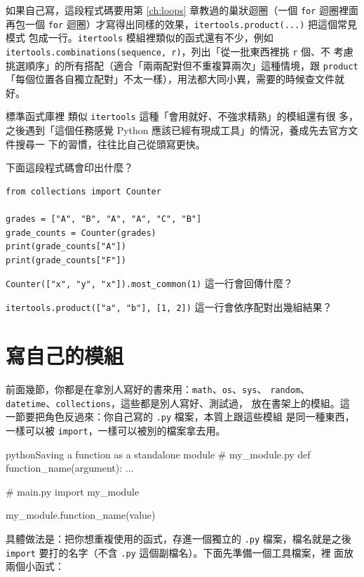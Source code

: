 如果自己寫，這段程式碼要用第 \ref{ch:loops} 章教過的巢狀迴圈（一個 \texttt{for} 迴圈裡面再包一個
\texttt{for} 迴圈）才寫得出同樣的效果，\texttt{itertools.product(...)} 把這個常見模式
包成一行。\texttt{itertools} 模組裡類似的函式還有不少，例如
\texttt{itertools.combinations(sequence, r)}，列出「從一批東西裡挑 \texttt{r} 個、不
考慮挑選順序」的所有搭配（適合「兩兩配對但不重複算兩次」這種情境，跟 \texttt{product}
「每個位置各自獨立配對」不太一樣），用法都大同小異，需要的時候查文件就好。

標準函式庫裡
類似 \texttt{itertools} 這種「會用就好、不強求精熟」的模組還有很
多，之後遇到「這個任務感覺 Python 應該已經有現成工具」的情況，養成先去官方文件搜尋一
下的習慣，往往比自己從頭寫更快。

\begin{drills}[label=drills:collections-and-itertools]
\item 下面這段程式碼會印出什麼？
\begin{verbatim}
from collections import Counter

grades = ["A", "B", "A", "A", "C", "B"]
grade_counts = Counter(grades)
print(grade_counts["A"])
print(grade_counts["F"])
\end{verbatim}
\item \texttt{Counter(["x", "y", "x"]).most\_common(1)} 這一行會回傳什麼？
\item \texttt{itertools.product(["a", "b"], [1, 2])} 這一行會依序配對出幾組結果？
\end{drills}

\section{寫自己的模組}
\label{sec:write-your-own-module}

前面幾節，你都是在拿別人寫好的書來用：\texttt{math}、\texttt{os}、\texttt{sys}、
\texttt{random}、\texttt{datetime}、\texttt{collections}，這些都是別人寫好、測試過，
放在書架上的模組。這一節要把角色反過來：你自己寫的 \texttt{.py} 檔案，本質上跟這些模組
是同一種東西，一樣可以被 \texttt{import}，一樣可以被別的檔案拿去用。

\begin{code}{python}{Saving a function as a standalone module}
# my_module.py
def function_name(argument):
    ...

# main.py
import my_module

my_module.function_name(value)
\end{code}

具體做法是：把你想重複使用的函式，存進一個獨立的 \texttt{.py} 檔案，檔名就是之後
\texttt{import} 要打的名字（不含 \texttt{.py} 這個副檔名）。下面先準備一個工具檔案，裡
面放兩個小函式：

